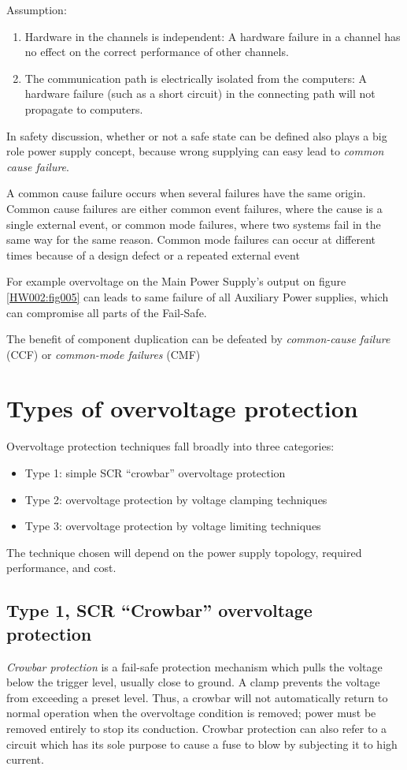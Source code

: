 \documentclass[journal]{IEEEtran}
\begin{document}
  Assumption:
  \begin{enumerate}
    \item Hardware in the channels is independent: A hardware failure in a channel has no effect 
          on the correct performance of other channels.
    \item The communication path is electrically isolated from the computers: A hardware failure 
          (such as a short circuit) in the connecting path will not propagate to computers.
   \end{enumerate}
   
  In safety discussion, whether or not a safe state can be defined also plays a big role power 
  supply concept, because wrong supplying can easy lead to \emph{common cause failure}.
  
  A common cause failure occurs when several failures have the same origin. Common cause failures 
  are either common event failures, where the cause is a single external event, or common mode 
  failures, where two systems fail in the same way for the same reason. Common mode failures can 
  occur at different times because of a design defect or a repeated external event
  
  For example overvoltage on the Main Power Supply's output on figure \ref{HW002:fig005} can leads 
  to same failure of all Auxiliary Power supplies, which can compromise all parts of the Fail-Safe. 
  
  The benefit of component duplication can be defeated by \emph{common-cause failure} (CCF) or 
  \emph{common-mode failures} (CMF)

\section{Types of overvoltage protection}
  Overvoltage protection techniques fall broadly into three categories:
  \begin{itemize}
   \item Type 1: simple SCR “crowbar” overvoltage protection
   \item Type 2: overvoltage protection by voltage clamping techniques
   \item Type 3: overvoltage protection by voltage limiting techniques
  \end{itemize}

  The technique chosen will depend on the power supply topology, required performance, and cost.
  
  \subsection{Type 1, SCR “Crowbar” overvoltage protection}
    \emph{Crowbar protection} is a fail-safe protection mechanism which pulls the voltage below 
    the trigger level, usually close to ground. A clamp prevents the voltage from exceeding a 
    preset level. Thus, a crowbar will not automatically return to normal operation when the 
    overvoltage condition is removed; power must be removed entirely to stop its conduction. 
    Crowbar protection can also refer to a circuit which has its sole purpose to cause a fuse to 
    blow by subjecting it to high current.
  
\end{document}
